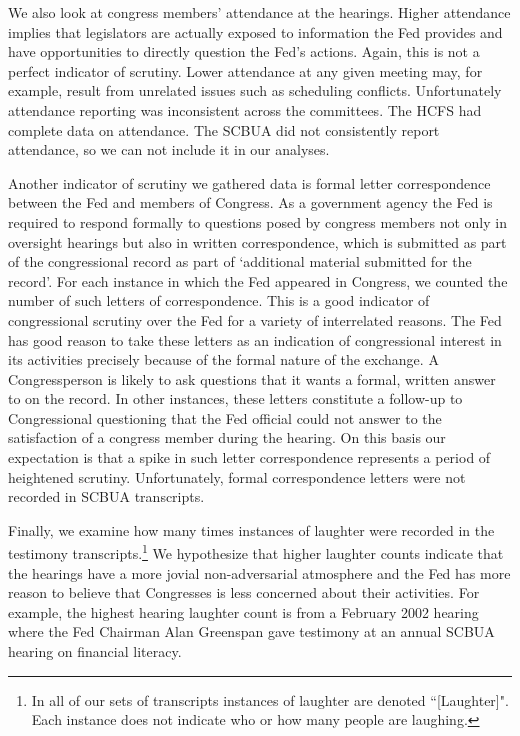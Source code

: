 \documentclass[a4paper]{article}\usepackage[]{graphicx}\usepackage[]{color}
\begin{document}
We also look at congress members' attendance at the hearings. Higher attendance implies that legislators are actually exposed to information the Fed provides and have opportunities to directly question the Fed's actions. Again, this is not a perfect indicator of scrutiny. Lower attendance at any given meeting may, for example, result from unrelated issues such as scheduling conflicts. Unfortunately attendance reporting was inconsistent across the committees. The HCFS had complete data on attendance. The SCBUA did not consistently report attendance, so we can not include it in our analyses.

Another indicator of scrutiny we gathered data is formal letter correspondence between the Fed and members of Congress. As a government agency the Fed is required to respond formally to questions posed by congress members not only in oversight hearings but also in written correspondence, which is submitted as part of the congressional record as part of `additional material submitted for the record'. For each instance in which the Fed appeared in Congress, we counted the number of such letters of correspondence. This is a good indicator of congressional scrutiny over the Fed for a variety of interrelated reasons. The Fed has good reason to take these letters as an indication of congressional interest in its activities precisely because of the formal nature of the exchange. A Congressperson is likely to ask questions that it wants a formal, written answer to on the record. In other instances, these letters constitute a follow-up to Congressional questioning that the Fed official could not answer to the satisfaction of a congress member during the hearing. On this basis our expectation is that a spike in such letter correspondence represents a period of heightened scrutiny. Unfortunately, formal correspondence letters were not recorded in SCBUA transcripts.

Finally, we examine how many times instances of laughter were recorded in the testimony transcripts.\footnote{In all of our sets of transcripts instances of laughter are denoted ``[Laughter]". Each instance does not indicate who or how many people are laughing.} We hypothesize that higher laughter counts indicate that the hearings have a more jovial non-adversarial atmosphere and the Fed has more reason to believe that Congresses is less concerned about their activities. For example, the highest hearing laughter count is from a February 2002 hearing where the Fed Chairman Alan Greenspan gave testimony at an annual SCBUA hearing on financial literacy.
\end{document}
